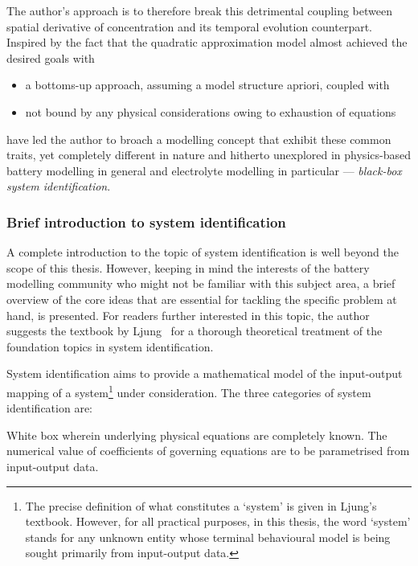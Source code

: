 The author's  approach is to  therefore break this detrimental  coupling between
spatial  derivative of  concentration  and its  temporal evolution  counterpart.
Inspired by the fact that the  quadratic approximation model almost achieved the
desired goals with
\begin{itemize}
    \item a bottoms-up approach, \ie{} assuming a model structure apriori, coupled with
    \item not bound by any physical considerations owing to exhaustion of equations
\end{itemize}
have  led  the  author  to  broach   a  modelling  concept  that  exhibit  these
common  traits,  yet completely  different  in  nature and  hitherto  unexplored
in  physics-based battery  modelling  in general  and  electrolyte modelling  in
particular --- \emph{black-box system identification}.

\subsubsection*{Brief introduction to system identification}\label{subsubsec:introsysid}

A complete introduction to the topic of system identification is well beyond the
scope of  this thesis.  However, keeping  in mind the  interests of  the battery
modelling community  who might not be  familiar with this subject  area, a brief
overview of the core ideas that  are essential for tackling the specific problem
at hand, is presented. For readers  further interested in this topic, the author
suggests  the  textbook by  Ljung~\cite{Ljung1999}  for  a thorough  theoretical
treatment of the foundation topics in system identification.

System identification aims  to provide a mathematical model  of the input-output
mapping  of  a system\footnote{The  precise  definition  of what  constitutes  a
`system' is given  in Ljung's textbook. However, for all  practical purposes, in
this thesis,  the word  `system' stands  for any  unknown entity  whose terminal
behavioural  model is  being  sought primarily  from  input-output data.}  under
consideration. The three categories of system identification are:


\begin{enumdescriptnum}[leftmargin=!,itemsep=1ex,labelwidth=\widthof{$\symbf{\text{brugg}_j}\ \scriptstyle (\times 3)$abc}
    ,partopsep=0pt
    ,topsep=0pt
    ]

\item[White box] wherein underlying physical equations are completely known. The
numerical value  of coefficients of  governing equations are to  be parametrised
from input-output data.

\end{enumdescriptnum}


